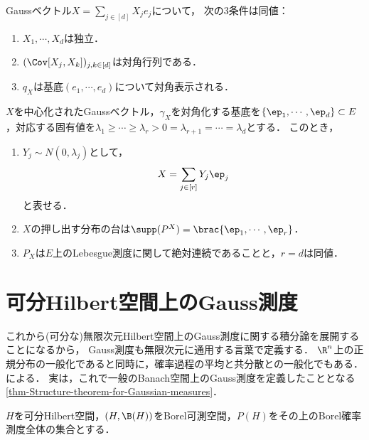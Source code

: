 \documentclass[uplatex,dvipdfmx]{jsreport}
\begin{document}
\begin{proposition}
    Gaussベクトル$X=\sum_{j\in[d]}X_je_j$について，
    次の3条件は同値：
    \begin{enumerate}
        \item $X_1,\cdots,X_d$は独立．
        \item $(\Cov[X_j,X_k])_{j,k\in[d]}$は対角行列である．
        \item $q_X$は基底$(e_1,\cdots,e_d)$について対角表示される．
    \end{enumerate}
\end{proposition}

\begin{corollary}
    $X$を中心化されたGaussベクトル，$\gamma_X$を対角化する基底を$\{\ep_1,\cdots,\ep_d\}\subset E$，対応する固有値を$\lambda_1\ge\cdots\ge\lambda_r>0=\lambda_{r+1}=\cdots=\lambda_d$とする．
    このとき，
    \begin{enumerate}
        \item $Y_j\sim N(0,\lambda_j)$として，
        \[X=\sum_{j\in[r]}Y_j\ep_j\]
        と表せる．
        \item $X$の押し出す分布の台は$\supp(P^X)=\brac{\ep_1,\cdots,\ep_r}$．
        \item $P_X$は$E$上のLebesgue測度に関して絶対連続であることと，$r=d$は同値．
    \end{enumerate}
\end{corollary}

\section{可分Hilbert空間上のGauss測度}

\begin{tcolorbox}[colframe=ForestGreen, colback=ForestGreen!10!white,breakable,colbacktitle=ForestGreen!40!white,coltitle=black,fonttitle=\bfseries\sffamily,
title=]
    これから(可分な)無限次元Hilbert空間上のGauss測度に関する積分論を展開することになるから，
    Gauss測度も無限次元に通用する言葉で定義する．
    $\R^n$上の正規分布の一般化であると同時に，確率過程の平均と共分散との一般化でもある．
    \cite{Prato}による．
    実は，これで一般のBanach空間上のGauss測度を定義したこととなる\ref{thm-Structure-theorem-for-Gaussian-measures}．
\end{tcolorbox}

\begin{notation}
    $H$を可分Hilbert空間，$(H,\B(H))$をBorel可測空間，$P(H)$をその上のBorel確率測度全体の集合とする．
\end{notation}
\end{document}
